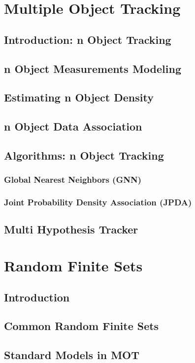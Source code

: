 \documentclass{beamer}
\begin{document}
	\section{Multiple Object Tracking}
	\subsection{Introduction: n Object Tracking}
	\subsection{n Object Measurements Modeling}
	\subsection{Estimating n Object Density}
	\subsection{n Object Data Association}
	\subsection{Algorithms: n Object Tracking}
		\subsubsection{Global Nearest Neighbors (GNN)}
		\subsubsection{Joint Probability Density Association (JPDA)}
	\subsection{Multi Hypothesis Tracker}	
	\section{Random Finite Sets}
	\subsection{Introduction}
	\subsection{Common Random Finite Sets}
	\subsection{Standard Models in MOT}
\end{document}

